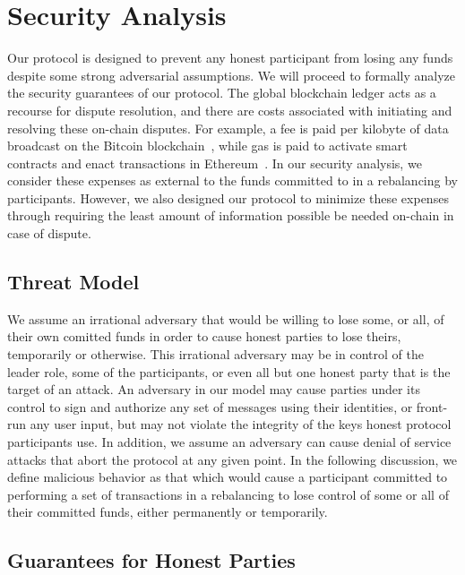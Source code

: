 \documentclass[sigconf]{acmart}
\begin{document}
\section{Security Analysis}
\label{sec:analysis}

Our protocol is designed to prevent any honest participant from losing any funds despite some strong adversarial assumptions. We will proceed to formally analyze the security guarantees of our protocol.
The global blockchain ledger acts as a recourse for dispute resolution, and there are costs associated with initiating and resolving these on-chain disputes. For example, a fee is paid per kilobyte of data broadcast on the Bitcoin blockchain~\cite{nakamoto2008bitcoin}, while gas is paid to activate smart contracts and enact transactions in Ethereum~\cite{buterin2014ethereum}. In our security analysis, we consider these expenses as external to the funds committed to in a rebalancing by participants. However, we also designed our protocol to minimize these expenses through requiring the least amount of information possible be needed on-chain in case of dispute.

\subsection{Threat Model}

We assume an irrational adversary that would be willing to lose some, or all, of their own comitted funds in order to cause honest parties to lose theirs, temporarily or otherwise. This irrational adversary may be in control of the leader role, some of the participants, or even all but one honest party that is the target of an attack.
An adversary in our model may cause parties under its control to sign and authorize any set of messages using their identities, or front-run any user input, but may not violate the integrity of the keys honest protocol participants use. In addition, we assume an adversary can cause denial of service attacks that abort the protocol at any given point.
In the following discussion, we define malicious behavior as that which would cause a participant committed to performing a set of transactions in a rebalancing to lose control of some or all of their committed funds, either permanently or temporarily.

\subsection{Guarantees for Honest Parties}
\end{document}
